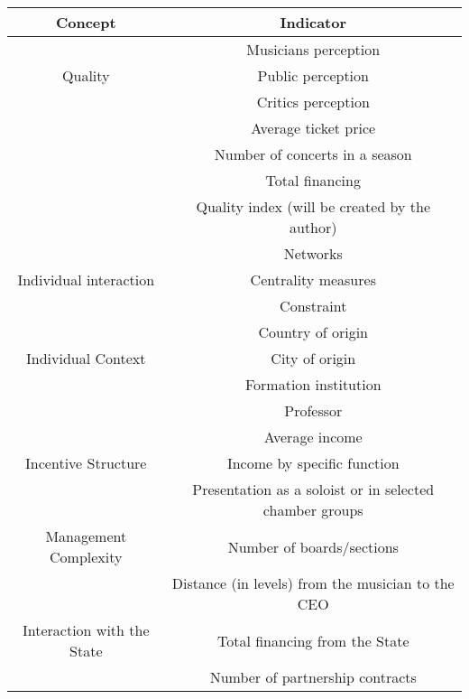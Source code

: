 \documentclass[a4paper, 12pt, openright, oneside, german, french, brazil, english, article]{abntex2}
\begin{document}
		
		
		
				
	\postextual
	
	
	\anexos
	
	\begin{table}[ht]
		{\begin{tabular}{|c|c|}
				
				\hline
				\textbf{Concept} & \textbf{Indicator} \\
				\hline
				&  Musicians perception \\
				Quality  & Public perception \\
				& Critics perception \\
				&  Average ticket price \\
				&  Number of concerts in a season \\
				&  Total financing \\
				&  Quality index (will be created by the author) \\
				\hline
				
				& Networks \\
				Individual interaction & Centrality measures  \\
				& Constraint      \\
				\hline
				& Country of origin  \\
				Individual Context & City of origin  \\
				& Formation institution \\
				& Professor    \\
				\hline
				& Average income  \\
				Incentive Structure & Income by specific function \\
				& Presentation as a soloist or in selected chamber groups \\
				\hline
				Management Complexity  & Number of boards/sections  \\
				& Distance (in levels) from the musician to the CEO \\
				\hline
				Interaction with the State  & Total financing from the State  \\
				& Number of partnership contracts \\
				\hline
				
				
			\end{tabular}
		}
		{}
		
	\end{table}
	
	
\end{document}

